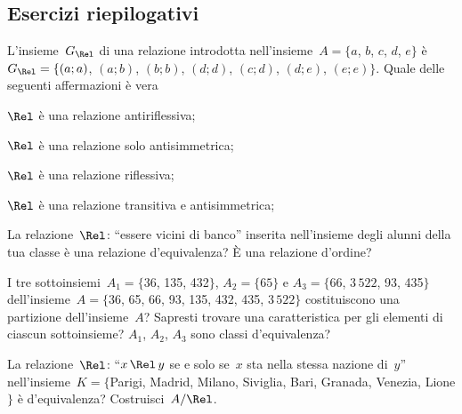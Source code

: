 \subsection{Esercizi riepilogativi}

\begin{esercizio}
\label{ese:\thechapter.44}
L'insieme~$G_\Rel$ di una relazione introdotta nell'insieme~$A = \{a$, $b$, $c$, $d$, $e\}$ è~$G_\Rel = \{ (a;a)$, $(a;b)$, $(b;b)$, $(d;d)$, $(c;d)$, $(d;e)$, $(e;e)\}$.
Quale delle seguenti affermazioni è vera
\begin{enumeratea}
\item $\Rel$ è una relazione antiriflessiva;
\item $\Rel$ è una relazione solo antisimmetrica;
\item $\Rel$ è una relazione riflessiva;
\item $\Rel$ è una relazione transitiva e antisimmetrica;
\end{enumeratea}
\end{esercizio}

\begin{esercizio}
\label{ese:\thechapter.45}
La relazione~$\Rel$: ``essere vicini di banco'' inserita nell'insieme degli alunni della tua classe è una
relazione d'equivalenza? \`E una relazione d'ordine?
\end{esercizio}

\begin{esercizio}
\label{ese:\thechapter.46}
I tre sottoinsiemi~$A_1 = \{$36, 135, 432$\}$, $A_2 = \{65\}$ e $A_3 = \{$66, $3\,522$, 93, 435$\}$ dell'insieme~$A = \{$36, 65, 66, 93, 135, 432, 435, $3\,522\}$ costituiscono una partizione dell'insieme~$A$? Sapresti trovare una caratteristica per gli elementi di ciascun sottoinsieme? $A_1$, $A_2$, $A_3$ sono classi d'equivalenza?
\end{esercizio}

\begin{esercizio}
\label{ese:\thechapter.47}
La relazione~$\Rel$: ``$x \,\Rel\, y$ se e solo se~$x$ sta nella stessa nazione di~$y$'' nell'insieme~$K= \{$Parigi, Madrid, Milano, Siviglia, Bari, Granada, Venezia, Lione$\}$
è d'equivalenza? Costruisci~$A/\Rel$.
\end{esercizio}

